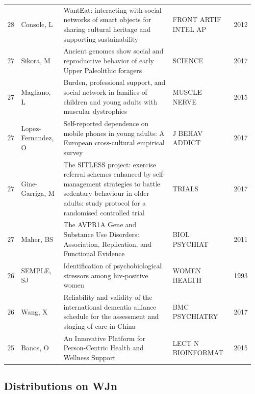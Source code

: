 \documentclass[11pt]{article} %
\begin{document}
\begin{longtable}{l|p{1.8cm}|p{9cm}|p{3cm}|l|}
28&	Console, L&	 WantEat: interacting with social networks of smart objects for sharing cultural heritage and supporting sustainability&	FRONT ARTIF INTEL AP&	2012\\
27&	Sikora, M&	 Ancient genomes show social and reproductive behavior of early Upper Paleolithic foragers&	SCIENCE&	2017\\
27&	Magliano, L&	 Burden, professional support, and social network in families of children and young adults with muscular dystrophies&	MUSCLE NERVE&	2015\\
27&	Lopez-Fernandez, O&	 Self-reported dependence on mobile phones in young adults: A European cross-cultural empirical survey&	J BEHAV ADDICT&	2017\\
27&	Gine-Garriga, M&	 The SITLESS project: exercise referral schemes enhanced by self-management strategies to battle sedentary behaviour in older adults: study protocol for a randomised controlled trial&	TRIALS&	2017\\
27&	Maher, BS&	 The AVPR1A Gene and Substance Use Disorders: Association, Replication, and Functional Evidence&	BIOL PSYCHIAT&	2011\\
26&	SEMPLE, SJ&	 Identification of psychobiological stressors among hiv-positive women&	WOMEN HEALTH&	1993\\
26&	Wang, X&	 Reliability and validity of the international dementia alliance schedule for the assessment and staging of care in China&	BMC PSYCHIATRY&	2017\\
25&	Banos, O&	 An Innovative Platform for Person-Centric Health and Wellness Support&	LECT N BIOINFORMAT&	2015\\
\end{longtable}

\subsection{Distributions on WJn}
\end{document}
